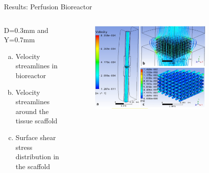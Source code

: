 \documentclass[11pt,t]{beamer}
\begin{document}
\begin{frame}[fragile]{Results: Perfusion Bioreactor}  

	\begin{columns}[t]
		\begin{column}{.40\textwidth}
		D=0.3mm and Y=0.7mm
		\begin{enumerate}[a)]
		\item
		Velocity streamlines in bioreactor
		\item
		Velocity streamlines around the tissue scaffold
		\item
		Surface shear stress distribution in the scaffold
		\end{enumerate}
	
 
		\end{column}
		\begin{column}{.60\textwidth}
			\vspace{-15pt}
			\begin{figure}
			\centering
			\includegraphics[width=0.8\textwidth]{flow_perf}
			
			\end{figure}
		\end{column}
	\end{columns}	
		
\end{frame}
\end{document}
